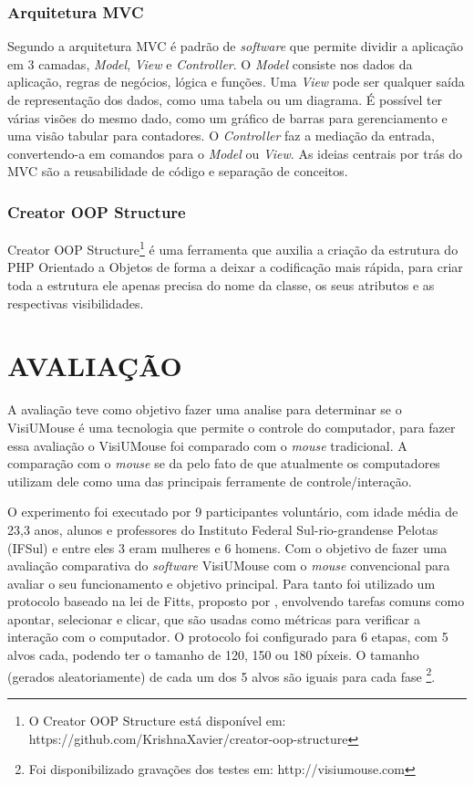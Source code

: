 \subsection{Arquitetura MVC}

Segundo  a arquitetura MVC é padrão de \textit{software} que permite dividir a aplicação em 3 camadas, \textit{Model}, \textit{View} e \textit{Controller}. O \textit{Model} consiste nos dados da aplicação, regras de negócios, lógica e funções. Uma \textit{View} pode ser qualquer saída de representação dos dados, como uma tabela ou um diagrama. É possível ter várias visões do mesmo dado, como um gráfico de barras para gerenciamento e uma visão tabular para contadores. O \textit{Controller} faz a mediação da entrada, convertendo-a em comandos para o \textit{Model} ou \textit{View}. As ideias centrais por trás do MVC são a reusabilidade de código e separação de conceitos.

\subsection{Creator OOP Structure}

Creator OOP Structure\footnote{O Creator OOP Structure está disponível em: https://github.com/KrishnaXavier/creator-oop-structure}  é uma ferramenta que auxilia a criação da estrutura do PHP Orientado a Objetos de forma a deixar a codificação mais rápida, para criar toda a estrutura ele apenas precisa do nome da classe, os seus atributos e as respectivas visibilidades.


\chapter{AVALIAÇÃO}\label{CAP7}
A avaliação teve como objetivo fazer uma analise para determinar se o VisiUMouse é uma tecnologia que permite o controle do computador, para fazer essa avaliação o VisiUMouse foi comparado com o \textit{mouse} tradicional. A comparação com o \textit{mouse} se da pelo fato de que atualmente os computadores utilizam dele como uma das principais ferramente de controle/interação.

O experimento foi executado por 9 participantes voluntário, com idade média de 23,3 anos, alunos e professores do Instituto Federal Sul-rio-grandense Pelotas (IFSul) e entre eles 3 eram mulheres e 6 homens. Com o objetivo de fazer uma avaliação comparativa do \textit{software} VisiUMouse com o \textit{mouse} convencional para avaliar o seu funcionamento e objetivo principal. Para tanto foi utilizado um protocolo baseado na lei de Fitts, proposto por , envolvendo tarefas comuns como apontar, selecionar e clicar, que são usadas como métricas para verificar a interação com o computador. O protocolo foi configurado para 6 etapas, com 5 alvos cada, podendo ter o tamanho de 120, 150 ou 180 píxeis. O tamanho (gerados aleatoriamente) de cada um dos 5 alvos são iguais para cada fase \footnote{Foi disponibilizado gravações dos testes em: http://visiumouse.com}.

